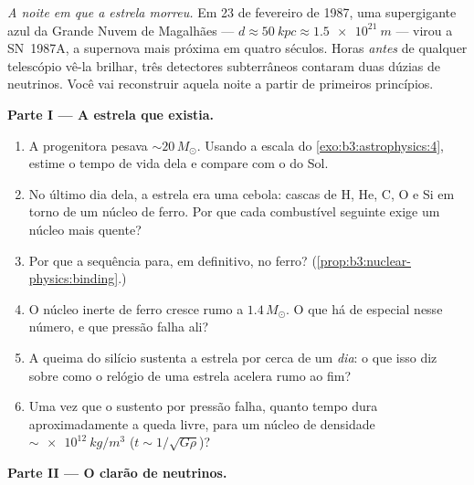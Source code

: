 \begin{problem}\label{pb:b3:astrophysics:1}
\emph{A noite em que a estrela morreu.} Em 23 de fevereiro de 1987, uma
supergigante azul da Grande Nuvem de Magalhães --- $d \approx
\qty{50}{kpc} \approx \qty{1.5e21}{m}$ --- virou a SN~1987A, a
supernova mais próxima em quatro séculos. Horas \emph{antes} de qualquer
telescópio vê-la brilhar, três detectores subterrâneos contaram
duas dúzias de neutrinos. Você vai reconstruir aquela noite a partir de
primeiros princípios.

\medskip\noindent\textbf{Parte I --- A estrela que existia.}

\begin{enumerate}
  \item A progenitora pesava ${\sim}20\,M_\odot$. Usando
        a escala do \cref{exo:b3:astrophysics:4}, estime o
        tempo de vida dela e compare com o do Sol.
  \item No último dia dela, a estrela era uma cebola: cascas de H, He, C,
        O e Si em torno de um núcleo de ferro. Por que cada
        combustível seguinte exige um núcleo mais quente?
  \item Por que a sequência para, em definitivo, no ferro?
        (\cref{prop:b3:nuclear-physics:binding}.)
  \item O núcleo inerte de ferro cresce rumo a $1.4\,M_\odot$. O que
        há de especial nesse número, e que pressão falha
        ali?
  \item A queima do silício sustenta a estrela por cerca de um
        \emph{dia}: o que isso diz sobre como o relógio de uma
        estrela acelera rumo ao fim?
  \item Uma vez que o sustento por pressão falha, quanto tempo dura
        aproximadamente a queda livre, para um núcleo de densidade
        $\sim\qty{e12}{kg/m^3}$ ($t \sim 1/\sqrt{G\rho}$)?
\end{enumerate}

\medskip\noindent\textbf{Parte II --- O clarão de neutrinos.}


\end{problem}
